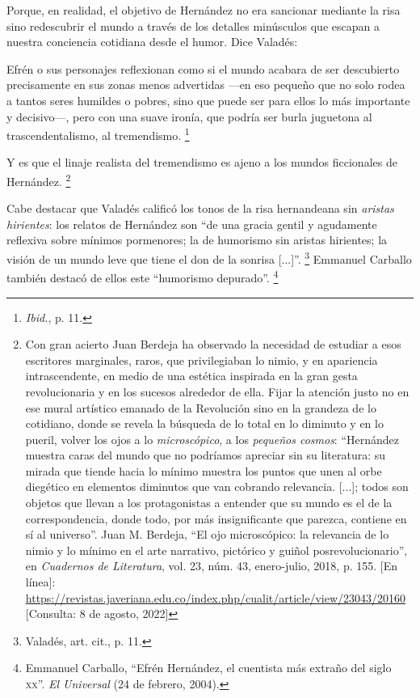 \documentclass[14pt,twoside,final]{extbook} %
\let\oldfootnote\footnote
\renewcommand\footnote[1]{%
\oldfootnote{\hspace{1mm}#1}}
\begin{document}
Porque, en realidad, el objetivo de Hernández no era sancionar mediante la risa sino redescubrir el mundo a través de los detalles minúsculos que escapan a nuestra conciencia cotidiana desde el humor. Dice Valadés: 
\begin{quoting}
Efrén o sus personajes reflexionan como si el mundo acabara de ser descubierto precisamente en sus zonas menos advertidas ---en eso pequeño que no solo rodea a tantos seres humildes o pobres, sino que puede ser para ellos lo más importante y decisivo---, pero con una suave ironía, que podría ser burla juguetona al trascendentalismo, al tremendismo.\footnote{\emph{Ibid.}, p. 11.}
\end{quoting}
Y es que el linaje realista del tremendismo es ajeno a los mundos ficcionales de Hernández.\footnote{Con gran acierto Juan Berdeja ha observado la necesidad de estudiar a esos escritores marginales, raros, que privilegiaban lo nimio, y en apariencia intrascendente, en medio de una estética inspirada en la gran gesta revolucionaria y en los sucesos alrededor de ella. Fijar la atención justo no en ese mural artístico emanado de la Revolución sino en la grandeza de lo cotidiano, donde se revela la búsqueda de lo total en lo diminuto y en lo pueril, volver los ojos a lo \emph{microscópico}, a los \emph{pequeños cosmos}: ``Hernández muestra caras del mundo que no podríamos apreciar sin su literatura: su mirada que tiende hacia lo mínimo muestra los puntos que unen al orbe diegético en elementos diminutos que van cobrando relevancia. [...]; todos son objetos que llevan a los protagonistas a entender que su mundo es el de la correspondencia, donde todo, por más insignificante que parezca, contiene en sí al universo''. Juan M. Berdeja, ``El ojo microscópico: la relevancia de lo nimio y lo mínimo en el arte narrativo, pictórico y guiñol posrevolucionario'', en \emph{Cuadernos de Literatura}, vol. 23, núm. 43, enero-julio, 2018, p. 155. [En línea]: \url{https://revistas.javeriana.edu.co/index.php/cualit/article/view/23043/20160} [Consulta: 8 de agosto, 2022]}

Cabe destacar que Valadés calificó los tonos de la risa hernandeana sin \emph{aristas hirientes}: los relatos de Hernández son ``de una gracia gentil y agudamente reflexiva sobre mínimos pormenores; la de humorismo sin aristas hirientes; la visión de un mundo leve que tiene el don de la sonrisa [...]''.\footnote{Valadés, art. cit., p. 11.} Emmanuel Carballo también destacó de ellos este ``humorismo depurado''.\footnote{Emmanuel Carballo, ``Efrén Hernández, el cuentista más extraño del siglo \textsc{xx}''. \emph{El Universal} (24 de febrero, 2004).}
\end{document}
